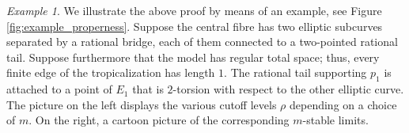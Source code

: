 \documentclass{compositio}
\theoremstyle{plain}
\theoremstyle{definition}
\theoremstyle{remark}
\newtheorem{exa}[thm]{Example}
\begin{document}
\begin{exa}
 We illustrate the above proof by means of an example, see Figure \ref{fig:example_properness}. Suppose the central fibre has two elliptic subcurves separated by a rational bridge, each of them connected to a two-pointed rational tail. Suppose furthermore that the model has regular total space; thus, every finite edge of the tropicalization has length $1$. The rational tail supporting $p_1$ is attached to a point of $E_1$ that is $2$-torsion with respect to the other elliptic curve. The picture on the left displays the various cutoff levels $\rho$ depending on a choice of $m$. On the right, a cartoon picture of the corresponding $m$-stable limits.
 
  \begin{figure}[htb]
  \centering
  \begin{minipage}[l]{.45\textwidth}
   \centering
\end{minipage}
\end{figure}
\end{exa}
\end{document}
